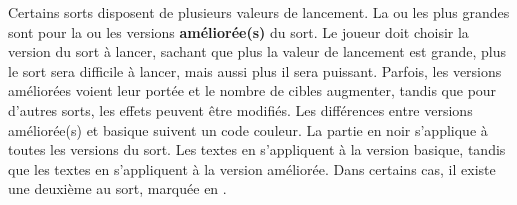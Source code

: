 \vspace*{10pt}
Certains sorts disposent de plusieurs valeurs de lancement. La ou les plus grandes sont pour la  ou les versions \textbf{améliorée(s)} du sort. Le joueur doit choisir la version du sort à lancer, sachant que plus la valeur de lancement est grande, plus le sort sera difficile à lancer, mais aussi plus il sera puissant. Parfois, les versions améliorées voient leur portée et le nombre de cibles augmenter, tandis que pour d'autres sorts, les effets peuvent être modifiés. Les différences entre versions améliorée(s) et basique suivent un code couleur. La partie en noir s'applique à toutes les versions du sort. Les textes en  s'appliquent à la version basique, tandis que les textes en  s'appliquent à la version améliorée. Dans certains cas, il existe une deuxième \augment{} au sort, marquée en . 



